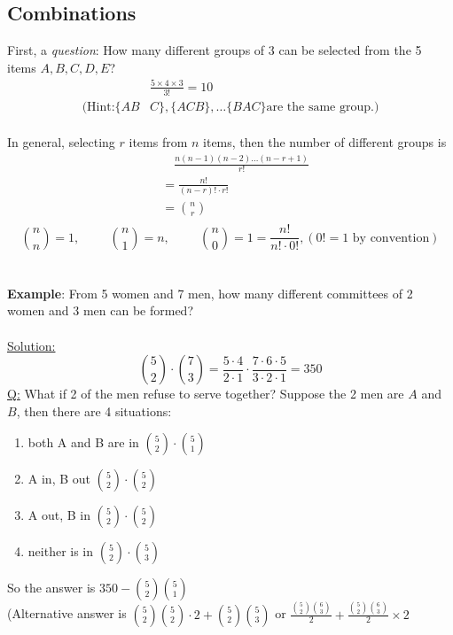\documentclass[11pt, letterpaper]{article}
\begin{document}
\subsection{Combinations}
First, a \textit{question}: How many different groups of 3 can be selected from the 5 items $A,B,C,D,E$?
\begin{align*}
  &\frac{5 \times 4 \times 3}{3!} = 10 \\
  (\text{Hint:} \{AB&C\}, \{ACB\}, \dots \{BAC\} \text{are the same group}.)
\end{align*} \\
In general, selecting $r$ items from $n$ items, then the number of different groups is
\begin{align*}
  &\quad   \frac{n(n-1)(n-2)\dots(n-r+1)}{r!} \\
  & = \frac{n!}{(n-r)!\cdot r!} \\
  & = \binom{n}{r} \\
\end{align*}
\begin{equation*}
  \binom{n}{n} = 1, \hspace{1cm} \binom{n}{1} = n, \hspace{1cm} \binom{n}{0} = 1 = \frac{n!}{n!\cdot 0!}, (0! = 1 \text{ by convention})
\end{equation*} \\ \\
\noindent
\textbf{Example}: From 5 women and 7 men, how many different committees of 2 women and 3 men can be formed? \\ \\
\noindent
\underline{Solution:}
\begin{equation*}
  \binom{5}{2} \cdot \binom{7}{3} = \frac{5\cdot 4}{2\cdot 1}\cdot \frac{7\cdot 6\cdot 5}{3\cdot 2\cdot 1} = 350
\end{equation*}
\underline{Q:} What if 2 of the men refuse to serve together?
Suppose the 2 men are $A$ and $B$, then there are 4 situations:
\begin{enumerate}
  \item both A and B are in $\binom{5}{2}\cdot \binom{5}{1}$
  \item A in, B out $\binom{5}{2}\cdot \binom{5}{2}$
  \item A out, B in $\binom{5}{2}\cdot \binom{5}{2}$
  \item neither is in $\binom{5}{2}\cdot \binom{5}{3}$
\end{enumerate}
So the answer is $350 - \binom{5}{2}\binom{5}{1}$ \\
(Alternative answer is $\binom{5}{2}\binom{5}{2}\cdot 2 + \binom{5}{2}\binom{5}{3}$ or $\frac{\binom{5}{2}\binom{6}{3}}{2} + \frac{\binom{5}{2}\binom{6}{3}}{2} \times 2$ \\ \\
\end{document}
